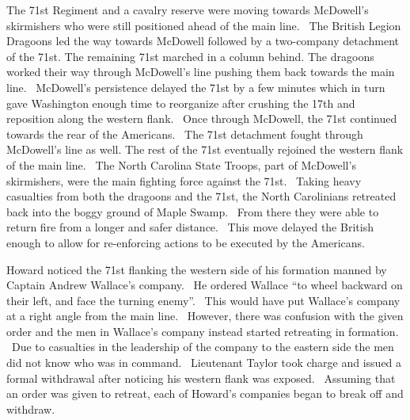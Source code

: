 The 71st Regiment and a cavalry reserve were moving towards McDowell’s
skirmishers who were still positioned ahead of the main line.  The British
Legion Dragoons led the way towards McDowell followed by a two-company
detachment of the 71st.  The remaining 71st marched in a column behind.  The
dragoons worked their way through McDowell’s line pushing them back towards the
main line.  McDowell’s persistence delayed the 71st by a few minutes which in
turn gave Washington enough time to reorganize after crushing the 17th and
reposition along the western flank.  Once through McDowell, the 71st continued
towards the rear of the Americans.  The 71st detachment fought through
McDowell’s line as well.  The rest of the 71st eventually rejoined the western
flank of the main line.  The North Carolina State Troops, part of McDowell’s
skirmishers, were the main fighting force against the 71st.  Taking heavy
casualties from both the dragoons and the 71st, the North Carolinians retreated
back into the boggy ground of Maple Swamp.  From there they were able to return
fire from a longer and safer distance.  This move delayed the British enough to
allow for re-enforcing actions to be executed by the Americans. 

Howard noticed the 71st flanking the western side of his formation manned by
Captain Andrew Wallace’s company.  He ordered Wallace “to wheel backward on
their left, and face the turning enemy”. \cite[p.109]{babits_devil_2001}  This would have put
Wallace’s company at a right angle from the main line.  However, there was
confusion with the given order and the men in Wallace’s company instead started
retreating in formation.  Due to casualties in the leadership of the company to
the eastern side the men did not know who was in command.  Lieutenant Taylor
took charge and issued a formal withdrawal after noticing his western flank was
exposed.  Assuming that an order was given to retreat, each of Howard’s
companies began to break off and withdraw.  


